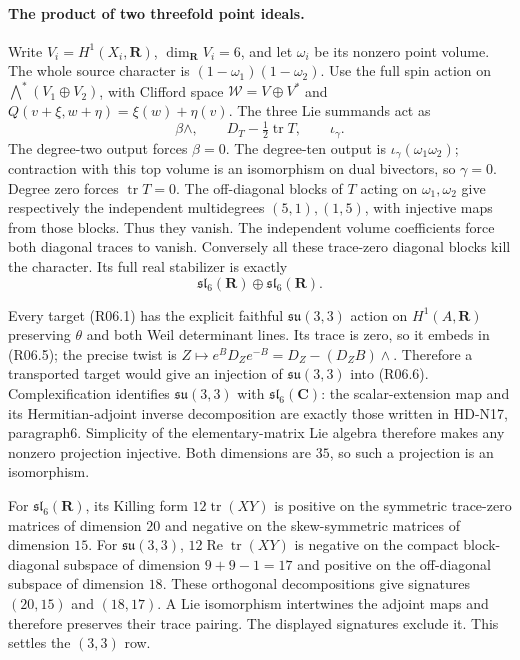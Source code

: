 \paragraph{The product of two threefold point ideals.}
Write $V_i=H^1(X_i,\mathbf R)$, $\dim_{\mathbf R}V_i=6$,
and let $\omega_i$ be its nonzero point volume. The whole source
character is $(1-\omega_1)(1-\omega_2)$. Use the full spin action
on $\bigwedge^*(V_1\oplus V_2)$, with Clifford space
$\mathcal W=V\oplus V^*$ and
$Q(v+\xi,w+\eta)=\xi(w)+\eta(v)$. The three Lie summands act as
\[
        \beta\wedge,\qquad D_T-\tfrac12\operatorname{tr}T,
                      \qquad\iota_\gamma.                    \tag{R06.5}
\]
The degree-two output forces $\beta=0$. The degree-ten output is
$\iota_\gamma(\omega_1\omega_2)$; contraction with this top
volume is an isomorphism on dual bivectors, so $\gamma=0$.
Degree zero forces $\operatorname{tr}T=0$. The off-diagonal
blocks of $T$ acting on $\omega_1,\omega_2$ give respectively
the independent multidegrees $(5,1),(1,5)$, with injective maps
from those blocks. Thus they vanish. The independent volume
coefficients force both diagonal traces to vanish. Conversely
all these trace-zero diagonal blocks kill the character. Its full
real stabilizer is exactly
\[
               \mathfrak{sl}_6(\mathbf R)\oplus
                          \mathfrak{sl}_6(\mathbf R).         \tag{R06.6}
\]

Every target (R06.1) has the explicit faithful
$\mathfrak{su}(3,3)$ action on $H^1(A,\mathbf R)$ preserving
$\theta$ and both Weil determinant lines. Its trace is zero, so
it embeds in (R06.5); the precise twist is
$Z\mapsto e^BD_Ze^{-B}=D_Z-(D_ZB)\wedge$. Therefore a transported
target would give an injection of $\mathfrak{su}(3,3)$ into
(R06.6). Complexification identifies $\mathfrak{su}(3,3)$ with
$\mathfrak{sl}_6(\mathbf C)$: the scalar-extension map and its
Hermitian-adjoint inverse decomposition are exactly those written
in HD-N17, paragraph6. Simplicity of the elementary-matrix Lie
algebra therefore makes any nonzero projection injective.
Both dimensions are $35$, so such a projection is an isomorphism.

For $\mathfrak{sl}_6(\mathbf R)$, its Killing form
$12\operatorname{tr}(XY)$ is positive on the symmetric trace-zero
matrices of dimension $20$ and negative on the skew-symmetric
matrices of dimension $15$. For $\mathfrak{su}(3,3)$,
$12\operatorname{Re}\operatorname{tr}(XY)$ is negative on the
compact block-diagonal subspace of dimension $9+9-1=17$ and
positive on the off-diagonal subspace of dimension $18$.
These orthogonal decompositions give signatures $(20,15)$ and
$(18,17)$. A Lie isomorphism intertwines the adjoint maps and
therefore preserves their trace pairing. The displayed signatures
exclude it. This settles the $(3,3)$ row.

